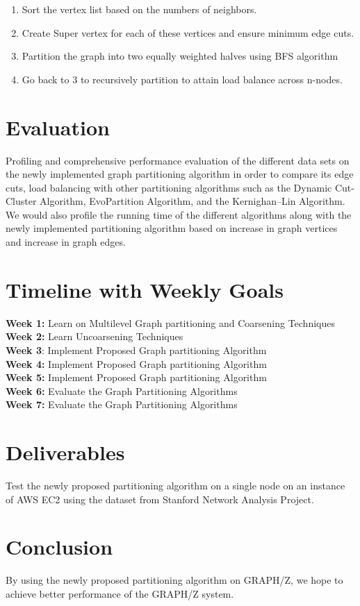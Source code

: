\documentclass[10pt]{article}
\begin{document}
\begin{multicols}{2}
  \begin{enumerate}
  \item Sort the vertex list based on the numbers of neighbors.
  \item Create Super vertex for each of these vertices and ensure minimum edge cuts.
  \item Partition the graph into two equally weighted halves using BFS algorithm
  \item Go back to 3 to recursively partition to attain load balance across n-nodes.
  \end{enumerate}
  
  \section{Evaluation}
  Profiling and comprehensive performance evaluation of the different data sets on the newly implemented graph partitioning algorithm in order to compare its edge cuts, load balancing with other partitioning algorithms such as the Dynamic Cut-Cluster Algorithm, EvoPartition Algorithm, and the Kernighan–Lin Algorithm. We would also profile the running time of the different algorithms along with the newly implemented partitioning algorithm based on increase in graph vertices and increase in graph edges.


  \section{Timeline with Weekly Goals}
  \textbf{Week 1:} Learn on Multilevel Graph partitioning and Coarsening Techniques\\
  \textbf{Week 2:} Learn Uncoarsening Techniques\\
  \textbf{Week 3}: Implement Proposed Graph partitioning Algorithm\\
  \textbf{Week 4:} Implement Proposed Graph partitioning Algorithm\\
  \textbf{Week 5:} Implement Proposed Graph partitioning Algorithm\\
  \textbf{Week 6:} Evaluate the Graph Partitioning Algorithms\\
  \textbf{Week 7:} Evaluate the Graph Partitioning Algorithms\\
  
  \section{Deliverables}
  Test the newly proposed partitioning algorithm on a single node on an instance of AWS EC2 using the dataset from Stanford Network Analysis Project.
  
   \section{Conclusion}
   By using the newly proposed partitioning algorithm on GRAPH/Z, we hope to achieve better performance of the GRAPH/Z system.
   
   
   
\end{multicols}
\end{document}

